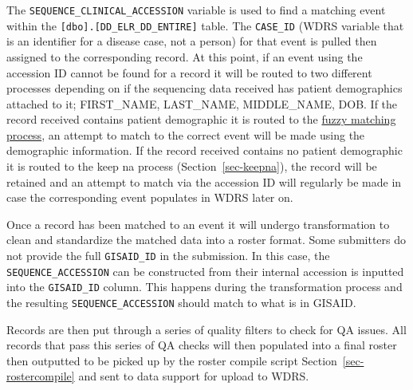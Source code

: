 \documentclass[
  letterpaper,
  DIV=11,
  numbers=noendperiod]{scrartcl}
\begin{document}
The \texttt{SEQUENCE\_CLINICAL\_ACCESSION} variable is used to find a
matching event within the \texttt{{[}dbo{]}.{[}DD\_ELR\_DD\_ENTIRE{]}}
table. The \texttt{CASE\_ID} (WDRS variable that is an identifier for a
disease case, not a person) for that event is pulled then assigned to
the corresponding record. At this point, if an event using the accession
ID cannot be found for a record it will be routed to two different
processes depending on if the sequencing data received has patient
demographics attached to it; FIRST\_NAME, LAST\_NAME, MIDDLE\_NAME, DOB.
If the record received contains patient demographic it is routed to the
\href{notebooks/fuzzy.Rmd}{fuzzy matching process}, an attempt to match
to the correct event will be made using the demographic information. If
the record received contains no patient demographic it is routed to the
keep na process (Section~\ref{sec-keepna}), the record will be retained
and an attempt to match via the accession ID will regularly be made in
case the corresponding event populates in WDRS later on.

Once a record has been matched to an event it will undergo
transformation to clean and standardize the matched data into a roster
format. Some submitters do not provide the full \texttt{GISAID\_ID} in
the submission. In this case, the \texttt{SEQUENCE\_ACCESSION} can be
constructed from their internal accession is inputted into the
\texttt{GISAID\_ID} column. This happens during the transformation
process and the resulting \texttt{SEQUENCE\_ACCESSION} should match to
what is in GISAID.

Records are then put through a series of quality filters to check for QA
issues. All records that pass this series of QA checks will then
populated into a final roster then outputted to be picked up by the
roster compile script Section~\ref{sec-rostercompile} and sent to data
support for upload to WDRS.

\begin{figure}[H]


\caption{\label{fig-roster}}

\end{figure}%
\end{document}
